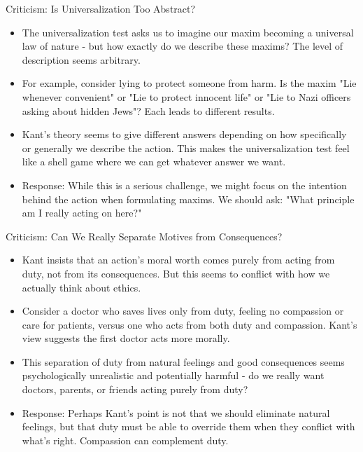 \documentclass{beamer}
\begin{document}
\begin{frame}{Criticism: Is Universalization Too Abstract?}
\begin{itemize}
    \item The universalization test asks us to imagine our maxim becoming a universal law of nature - but how exactly do we describe these maxims? The level of description seems arbitrary.
    
    \item For example, consider lying to protect someone from harm. Is the maxim "Lie whenever convenient" or "Lie to protect innocent life" or "Lie to Nazi officers asking about hidden Jews"? Each leads to different results.
    
    \item Kant's theory seems to give different answers depending on how specifically or generally we describe the action. This makes the universalization test feel like a shell game where we can get whatever answer we want.
    
    \item Response: While this is a serious challenge, we might focus on the intention behind the action when formulating maxims. We should ask: "What principle am I really acting on here?"
\end{itemize}
\end{frame}

\begin{frame}{Criticism: Can We Really Separate Motives from Consequences?}
\begin{itemize}
    \item Kant insists that an action's moral worth comes purely from acting from duty, not from its consequences. But this seems to conflict with how we actually think about ethics.
    
    \item Consider a doctor who saves lives only from duty, feeling no compassion or care for patients, versus one who acts from both duty and compassion. Kant's view suggests the first doctor acts more morally.
    
    \item This separation of duty from natural feelings and good consequences seems psychologically unrealistic and potentially harmful - do we really want doctors, parents, or friends acting purely from duty?
    
    \item Response: Perhaps Kant's point is not that we should eliminate natural feelings, but that duty must be able to override them when they conflict with what's right. Compassion can complement duty.
\end{itemize}
\end{frame}
\end{document}
